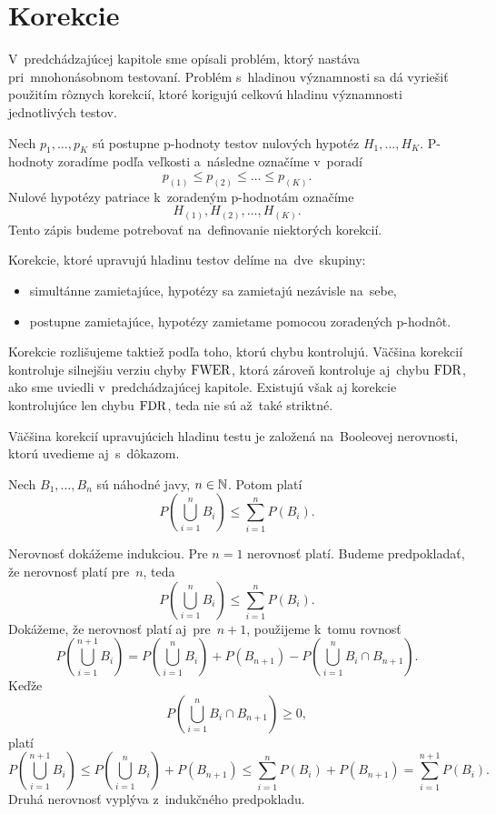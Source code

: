 \chapter{Korekcie}

V~predchádzajúcej kapitole sme opísali problém, ktorý nastáva pri~mnohonásobnom testovaní. 
Problém s~hladinou významnosti sa dá vyriešiť použitím rôznych korekcií, 
ktoré korigujú celkovú hladinu významnosti jednotlivých testov.  

Nech $p_1, \dots, p_K$ sú postupne p-hodnoty testov nulových hypotéz $H_1, \dots, H_K$. 
P-hodnoty zoradíme podľa veľkosti a~následne označíme v~poradí
$$ p_{(1)} \leq p_{(2)} \leq \dots \leq p_{(K)}. $$ 
Nulové hypotézy patriace k~zoradeným p-hodnotám označíme 
$$ H_{(1)}, H_{(2)}, \dots, H_{(K)}. $$ 
Tento zápis budeme potrebovať na~definovanie niektorých korekcií. 

Korekcie, ktoré upravujú hladinu testov delíme na~dve~skupiny: 
\begin{itemize}
  \item simultánne zamietajúce, hypotézy sa zamietajú nezávisle na~sebe, 
  \item postupne zamietajúce, hypotézy zamietame pomocou zoradených p-hodnôt. 
\end{itemize}

Korekcie rozlišujeme taktiež podľa toho, ktorú chybu kontrolujú. 
Väčšina korekcií kontroluje silnejšiu verziu chyby ${\rm FWER}$, ktorá zároveň kontroluje aj~chybu ${\rm FDR}$, 
ako sme uviedli v~predchádzajúcej kapitole.  
Existujú však aj korekcie kontrolujúce len chybu ${\rm FDR}$, 
teda nie sú až~také striktné. 

Väčšina korekcií upravujúcich hladinu testu je založená na~Booleovej nerovnosti, 
ktorú uvedieme aj~s~dôkazom. 

\begin{tvrd}\label{tvrd02}
  Nech $B_1, \dots, B_n$ sú náhodné javy, $n \in \mathbb{N}$. 
  Potom platí 
  $$ P \left( \bigcup_{i=1}^{n} B_i \right) \leq \sum_{i=1}^{n} P \left( B_i \right). $$
\end{tvrd}    
\begin{dokaz}
  Nerovnosť dokážeme indukciou. 
  Pre $n = 1$ nerovnosť platí. 
  Budeme predpokladať, že nerovnosť platí pre~$n$, teda
  $$ P \left( \bigcup_{i=1}^{n} B_i \right) \leq \sum_{i=1}^{n} P \left( B_i \right). $$ 
  Dokážeme, že nerovnosť platí aj~pre~$n+1$, 
  použijeme k~tomu rovnosť
  $$ P \left( \bigcup_{i=1}^{n+1} B_i \right) 
    = P \left( \bigcup_{i=1}^{n} B_i \right) + P ( B_{n+1} ) - P \left( \bigcup_{i=1}^{n} B_i \cap B_{n+1} \right). $$
  Keďže $$ P \left( \bigcup_{i=1}^{n} B_i \cap B_{n+1} \right) \geq 0, $$
  platí 
  $$ P \left( \bigcup_{i=1}^{n+1} B_i \right) 
    \leq P \left( \bigcup_{i=1}^{n} B_i \right) + P ( B_{n+1} ) 
    \leq \sum_{i=1}^{n} P \left( B_i \right) + P ( B_{n+1} ) = \sum_{i=1}^{n+1} P \left( B_i \right). $$ 
  Druhá nerovnosť vyplýva z~indukčného predpokladu. 
\end{dokaz}

